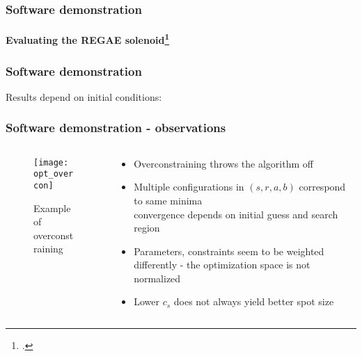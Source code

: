 
\begin{frame}
  \frametitle{Software demonstration}
  \rfn
  \framesubtitle{Evaluating the REGAE solenoid\footcite{Disser}}
  \begin{figure}
    \hspace{-0.5cm}
    \hspace{0.5cm}

  \end{figure}
\end{frame}

\begin{frame}
  \rfn
  \frametitle{Software demonstration}
  Results depend on initial conditions:
  \begin{figure}
    \hspace{-0.5cm}
    \hspace{0.5cm}

  \end{figure}
\end{frame}

\begin{frame}
  \rfn
  \frametitle{Software demonstration - observations}
  \begin{columns}
    \begin{column}{0.5\textwidth}
    \begin{figure}
      \texttt{[image: opt\_overcon]}
      \caption{Example of overconstraining}
    \end{figure}
    \end{column}
    \begin{column}{0.5\textwidth}
      \begin{itemize}
        \item Overconstraining throws the algorithm off
        \vspace{0.4cm}
        \item Multiple configurations in $(s, r, a, b)$ correspond to same minima\\
          \rarrow convergence depends on initial guess and search region
        \vspace{0.4cm}
        \item Parameters, constraints seem to be weighted differently - the optimization space is not normalized
        \vspace{0.4cm}
        \item Lower $c_s$ does not always yield better spot size
      \end{itemize}
    \end{column}
  \end{columns}
\end{frame}


